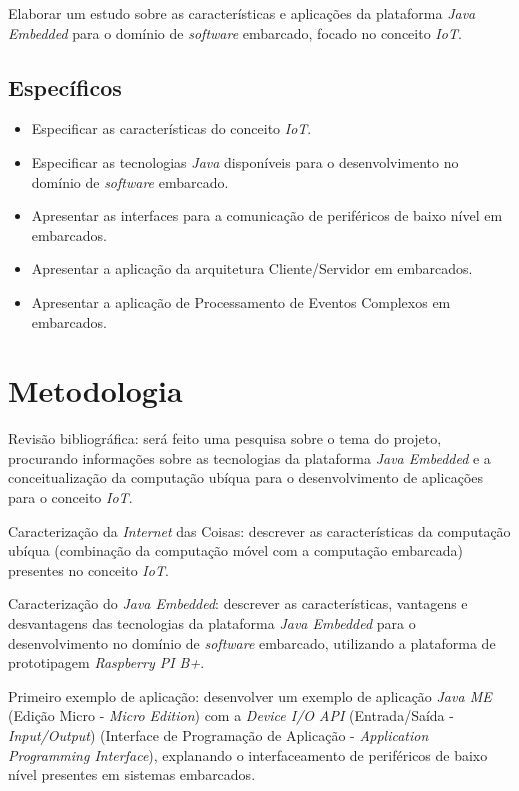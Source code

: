 Elaborar um estudo sobre as características e aplicações da plataforma
\textit{Java Embedded} para o domínio de \textit{software} embarcado, focado no
conceito \textit{IoT}.

\subsection{Específicos}

\begin{itemize}

    \item Especificar as características do conceito \textit{IoT}.

    \item Especificar as tecnologias \textit{Java} disponíveis para o
    desenvolvimento no domínio de \textit{software} embarcado.

    \item Apresentar as interfaces para a comunicação de periféricos de baixo
    nível em embarcados.

    \item Apresentar a aplicação da arquitetura Cliente/Servidor em embarcados.

    \item Apresentar a aplicação de Processamento de Eventos Complexos em
    embarcados.

\end{itemize}

\section{Metodologia}

Revisão bibliográfica: será feito uma pesquisa sobre o tema do projeto,
procurando informações sobre as tecnologias da plataforma \textit{Java
    Embedded} e a conceitualização da computação ubíqua para o desenvolvimento
de aplicações para o conceito \textit{IoT}.

Caracterização da \textit{Internet} das Coisas: descrever as características da
computação ubíqua (combinação da computação móvel com a computação embarcada)
presentes no conceito \textit{IoT}.

Caracterização do \textit{Java Embedded}: descrever as características,
vantagens e desvantagens das tecnologias da plataforma \textit{Java Embedded}
para o desenvolvimento no domínio de \textit{software} embarcado, utilizando a
plataforma de prototipagem \textit{Raspberry PI B+}.

Primeiro exemplo de aplicação: desenvolver um exemplo de aplicação \textit{Java
    ME} (Edição Micro - \textit{Micro Edition}) com a \textit{Device I/O API}
(Entrada/Saída - \textit{Input/Output}) (Interface de Programação de Aplicação
- \textit{Application Programming Interface}), explanando o interfaceamento de
periféricos de baixo nível presentes em sistemas embarcados.

